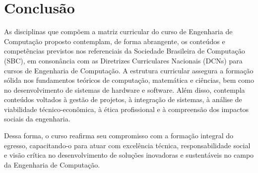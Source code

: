 \section{Conclusão}

As disciplinas que compõem a matriz curricular do curso de Engenharia de Computação proposto contemplam, de forma abrangente, os conteúdos e competências previstos nos referenciais da Sociedade Brasileira de Computação (SBC), em consonância com as Diretrizes Curriculares Nacionais (DCNs) para cursos de Engenharia de Computação. A estrutura curricular assegura a formação sólida nos fundamentos teóricos de computação, matemática e ciências, bem como no desenvolvimento de sistemas de hardware e software. Além disso, contempla conteúdos voltados à gestão de projetos, à integração de sistemas, à análise de viabilidade técnico-econômica, à ética profissional e à compreensão dos impactos sociais da engenharia.

Dessa forma, o curso reafirma seu compromisso com a formação integral do egresso, capacitando-o para atuar com excelência técnica, responsabilidade social e visão crítica no desenvolvimento de soluções inovadoras e sustentáveis no campo da Engenharia de Computação.


